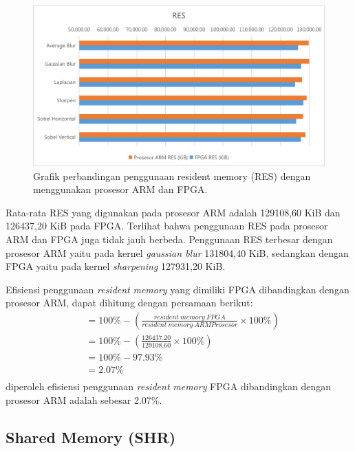 \begin{figure}[H]
    \includegraphics[width=0.81\linewidth, center]{images/chart/chart-res.png}
    \caption{Grafik perbandingan penggunaan resident memory (RES) dengan menggunakan prosesor ARM dan FPGA.}
    \label{fig:chart-res}
\end{figure}
Rata-rata RES yang digunakan pada prosesor ARM adalah 129108,60 KiB dan 126437,20 KiB pada FPGA. Terlihat bahwa penggunaan RES pada prosesor ARM dan FPGA juga tidak jauh berbeda. Penggunaan RES terbesar dengan prosesor ARM yaitu pada kernel \textit{gaussian blur} 131804,40 KiB, sedangkan dengan FPGA yaitu pada kernel \textit{sharpening} 127931,20 KiB.

Efisiensi penggunaan \textit{resident} \textit{memory} yang dimiliki FPGA dibandingkan dengan prosesor ARM, dapat dihitung dengan persamaan berikut:
\begin{equation*}
    \begin{split}
& = 100\% - \left( \frac{resident\ memory\ FPGA}{resident\ memory\ ARM Prosesor} \times 100\% \right) \\
& = 100\% - \left( \frac{126437.20}{129108.60} \times 100\% \right) \\
& = 100\% - 97.93\% \\
& = 2.07\% \\
    \end{split}
\end{equation*}
diperoleh efisiensi penggunaan \textit{resident} \textit{memory} FPGA dibandingkan dengan prosesor ARM adalah sebesar 2.07\%.

\subsection{Shared Memory (SHR)}

